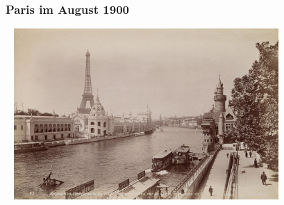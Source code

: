 \documentclass[onlymath]{beamer}
\begin{document}
% 



\begin{frame}\frametitle{Paris im August 1900}\label{frame_paris}

~\hfill
\includegraphics[height=6.5cm]{images/Paris-1900-Weltausstellung}
\hfill~

\end{frame}
\end{document}
